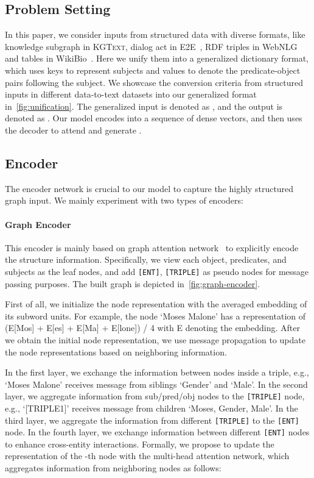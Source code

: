 \documentclass[11pt,a4paper]{article}
\newcommand{\dataset}{\textsc{KGText}\xspace}
\begin{document}
\subsection{Problem Setting}
In this paper, we consider inputs from structured data with diverse formats, like knowledge subgraph in \dataset, dialog act in E2E~\cite{dusek2019e2e}, RDF triples in WebNLG~\cite{shimorina2018handling} and tables in WikiBio~\cite{lebret2016neural}. Here we unify them into a generalized dictionary format, which uses keys to represent subjects and values to denote the predicate-object pairs following the subject. We showcase the conversion criteria from structured inputs in different data-to-text datasets into our generalized format in~\autoref{fig:unification}. The generalized input is denoted as , and the output is denoted as . Our model encodes  into a sequence of dense vectors, and then uses the decoder to attend and generate . 

\subsection{Encoder}
The encoder network is crucial to our model to capture the highly structured graph input. We mainly experiment with two types of encoders:
\paragraph{Graph Encoder}
This encoder is mainly based on graph attention network~\cite{li2015gated,kipf2016semi,velivckovic2017graph} to explicitly encode the structure information. Specifically, we view each object, predicates, and subjects as the leaf nodes, and add \texttt{[ENT]}, \texttt{[TRIPLE]} as pseudo nodes for message passing purposes. The built graph is depicted in~\autoref{fig:graph-encoder}.

First of all, we initialize the node representation with the averaged embedding of its subword units. For example, the node `Moses Malone' has a representation of (E[Mos] + E[es] + E[Ma] + E[lone]) / 4 with E denoting the embedding. After we obtain the initial node representation, we use message propagation to update the node representations based on neighboring information. 

In the first layer, we exchange the information between nodes inside a triple, e.g., `Moses Malone' receives message from siblings `Gender' and `Male'. In the second layer, we aggregate information from sub/pred/obj nodes to the \texttt{[TRIPLE]} node, e.g., `[TRIPLE1]' receives message from children `Moses, Gender, Male'. In the third layer, we aggregate the information from different \texttt{[TRIPLE]} to the \texttt{[ENT]} node. In the fourth layer, we exchange information between different \texttt{[ENT]} nodes to enhance cross-entity interactions. Formally, we propose to update the representation of the -th node  with the multi-head attention network, which aggregates information from neighboring nodes  as follows:
\end{document}
